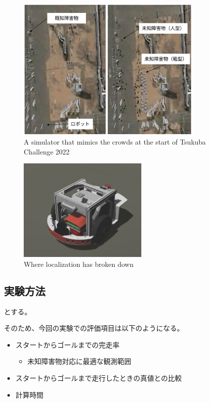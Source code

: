 \documentclass{jarticle}
\begin{document}
\begin{figure}[htbp]
  \centering
   \includegraphics[height=70mm]{fig/environment_comparison.png}
   \vspace*{-4mm}
   \caption{A simulator that mimics the crowds at the start of Tsukuba Challenge 2022}
   \label{fig: つくばチャレンジ人混みシミュレータ}
\end{figure}

\begin{figure}[htbp]
  \centering
   \includegraphics[height=50mm]{fig/raspicat_gazebo.png}
   \vspace*{-4mm}
   \caption{Where localization has broken down}
   \label{fig: raspicat}
\end{figure}

\subsection{実験方法}

とする。

そのため、今回の実験での評価項目は以下のようになる。

\begin{itemize}
  \item スタートからゴールまでの完走率
  \begin{itemize}
    \item 未知障害物対応に最適な観測範囲
  \end{itemize}
  \item スタートからゴールまで走行したときの真値との比較
  \item 計算時間
\end{itemize}
\end{document}
